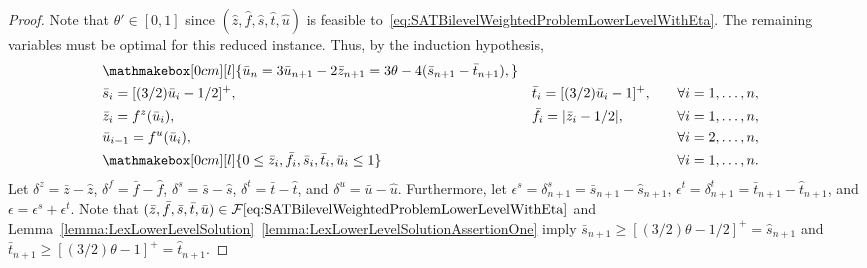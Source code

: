 \documentclass[runningheads,orivec]{llncs}
\newcommand{\MacroColor}[1]{#1}
\newcommand{\NVariables}{\MacroColor{n}}
\newcommand{\FeasSolSet}{\MacroColor{\mathcal{F}}}
\newcommand{\ReformZ}{\MacroColor{z}}
\newcommand{\ReformAugFrac}{\MacroColor{f}}
\newcommand{\LexUVar}{\MacroColor{\theta}}
\newcommand{\LexLVarS}{\MacroColor{s}}
\newcommand{\LexLVarT}{\MacroColor{t}}
\newcommand{\LexLVarU}{\MacroColor{u}}
\newcommand{\LexLVarFuncU}{\MacroColor{f^u}}
\newcommand{\LexLVarFuncZ}{\MacroColor{f^z}}
\begin{document}
\begin{appendix}
\begin{proof}
Note that $\theta' \in [0, 1]$ since $(\hat{\ReformZ}, \hat{\ReformAugFrac}, \hat{\LexLVarS}, \hat{\LexLVarT}, \hat{\LexLVarU})$ is feasible to~\eqref{eq:SATBilevelWeightedProblemLowerLevelWithEta}.
The remaining variables must be optimal for this reduced instance.  
Thus, by the induction hypothesis,
\begin{align}
&
\mathmakebox[0cm][l]{
\bar{\LexLVarU}_{\NVariables} = 3 \bar{\LexLVarU}_{\NVariables + 1} - 2 \bar{\ReformZ}_{\NVariables + 1} = 3 \theta - 4 (\bar{\LexLVarS}_{\NVariables + 1} - \bar{\LexLVarT}_{\NVariables + 1}),
}
&&
\label{eq:lemma:SATBilevelLexProgrammingLowerLevelSimple}
\\
&
\bar{\LexLVarS}_i = [(3/2) \bar{\LexLVarU}_i - 1/2]^+, 
\quad
&&
\bar{\LexLVarT}_i = [(3/2) \bar{\LexLVarU}_i - 1]^+,
\quad
&&
\forall i = 1, \ldots, \NVariables,
\notag 
\\
&
\bar{\ReformZ}_i = \LexLVarFuncZ(\bar{\LexLVarU}_{i}),
&&
\bar{\ReformAugFrac}_i = |\bar{\ReformZ}_i - 1/2|,
&&
\forall i = 1, \ldots, \NVariables,
\notag 
\\
&
\bar{\LexLVarU}_{i - 1} = \LexLVarFuncU(\bar{\LexLVarU}_i),
&&
&&
\forall i = 2, \ldots, \NVariables, 
\notag \\
&
\mathmakebox[0cm][l]{
0 \le \bar{\ReformZ}_i, \bar{\ReformAugFrac}_i, \bar{\LexLVarS}_i, \bar{\LexLVarT}_i, \bar{\LexLVarU}_i \le 1
}
&&
&&
\forall i = 1, \ldots, \NVariables.
\notag 
\end{align}
Let $\delta^{\ReformZ} = \bar{\ReformZ} - \hat{\ReformZ}$, $\delta^{\ReformAugFrac} = \bar{\ReformAugFrac} - \hat{\ReformAugFrac}$, $\delta^{\LexLVarS} = \bar{\LexLVarS} - \hat{\LexLVarS}$, $\delta^{\LexLVarT} = \bar{\LexLVarT} - \hat{\LexLVarT}$, and $\delta^{\LexLVarU} = \bar{\LexLVarU} - \hat{\LexLVarU}$.
Furthermore, let $\epsilon^{\LexLVarS} = \delta^{\LexLVarS}_{\NVariables + 1} = \bar{\LexLVarS}_{\NVariables + 1} - \hat{\LexLVarS}_{\NVariables + 1}$, $\epsilon^{\LexLVarT} = \delta^{\LexLVarT}_{\NVariables + 1} = \bar{\LexLVarT}_{\NVariables + 1} - \hat{\LexLVarT}_{\NVariables + 1}$, and $\epsilon = \epsilon^{\LexLVarS} + \epsilon^{\LexLVarT}$.
Note that $(\bar{\ReformZ}, \bar{\ReformAugFrac}, \bar{\LexLVarS}, \bar{\LexLVarT}, \bar{\LexLVarU}) \in \FeasSolSet\eqref{eq:SATBilevelWeightedProblemLowerLevelWithEta}$ and Lemma~\ref{lemma:LexLowerLevelSolution}~\ref{lemma:LexLowerLevelSolutionAssertionOne} imply $\bar{\LexLVarS}_{\NVariables + 1} \ge [(3/2) \LexUVar - 1/2]^+ = \hat{\LexLVarS}_{\NVariables + 1}$ and $\bar{\LexLVarT}_{\NVariables + 1} \ge [(3/2) \LexUVar - 1]^+ = \hat{\LexLVarT}_{\NVariables + 1}$.

\end{proof}
\end{appendix}
\end{document}
